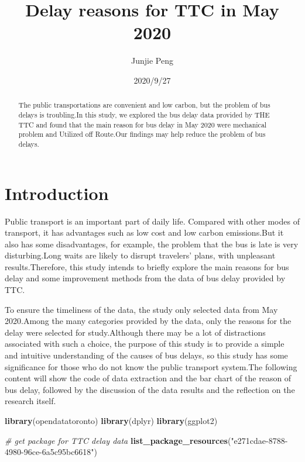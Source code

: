 \documentclass[
]{article}
\title{Delay reasons for TTC in May 2020}
\author{Junjie Peng}
\date{2020/9/27}
\newenvironment{Shaded}{\begin{snugshade}}{\end{snugshade}}
\newcommand{\CommentTok}[1]{\textcolor[rgb]{0.56,0.35,0.01}{\textit{#1}}}
\newcommand{\KeywordTok}[1]{\textcolor[rgb]{0.13,0.29,0.53}{\textbf{#1}}}
\newcommand{\NormalTok}[1]{#1}
\newcommand{\StringTok}[1]{\textcolor[rgb]{0.31,0.60,0.02}{#1}}
\begin{document}
\maketitle
\begin{abstract}
The public transportations are convenient and low carbon, but the
problem of bus delays is troubling.In this study, we explored the bus
delay data provided by THE TTC and found that the main reason for bus
delay in May 2020 were mechanical problem and Utilized off Route.Our
findings may help reduce the problem of bus delays.
\end{abstract}

\hypertarget{introduction}{%
\section{Introduction}\label{introduction}}

Public transport is an important part of daily life. Compared with other
modes of transport, it has advantages such as low cost and low carbon
emissions.But it also has some disadvantages, for example, the problem
that the bus is late is very disturbing.Long waits are likely to disrupt
travelers' plans, with unpleasant results.Therefore, this study intends
to briefly explore the main reasons for bus delay and some improvement
methods from the data of bus delay provided by TTC.

To ensure the timeliness of the data, the study only selected data from
May 2020.Among the many categories provided by the data, only the
reasons for the delay were selected for study.Although there may be a
lot of distractions associated with such a choice, the purpose of this
study is to provide a simple and intuitive understanding of the causes
of bus delays, so this study has some significance for those who do not
know the public transport system.The following content will show the
code of data extraction and the bar chart of the reason of bus delay,
followed by the discussion of the data results and the reflection on the
research itself.

\begin{Shaded}
\begin{Highlighting}[]
\KeywordTok{library}\NormalTok{(opendatatoronto)}
\KeywordTok{library}\NormalTok{(dplyr)}
\KeywordTok{library}\NormalTok{(ggplot2)}
\end{Highlighting}
\end{Shaded}

\begin{Shaded}
\begin{Highlighting}[]
\CommentTok{# get package for TTC delay data}
\KeywordTok{list_package_resources}\NormalTok{(}\StringTok{"e271cdae-8788-4980-96ce-6a5c95bc6618"}\NormalTok{)}
\end{Highlighting}
\end{Shaded}
\end{document}
